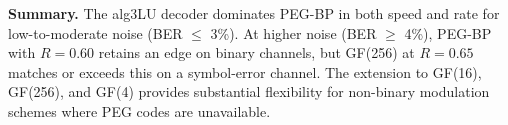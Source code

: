 \medskip

\textbf{Summary.}
The alg3\textunderscore{}LU decoder dominates PEG-BP in both speed and rate for low-to-moderate noise (BER $\leq$ 3\%). At higher noise (BER $\geq$ 4\%), PEG-BP with $R=0.60$ retains an edge on binary channels, but GF(256) at $R=0.65$ matches or exceeds this on a symbol-error channel. The extension to GF(16), GF(256), and GF(4) provides substantial flexibility for non-binary modulation schemes where PEG codes are unavailable.

